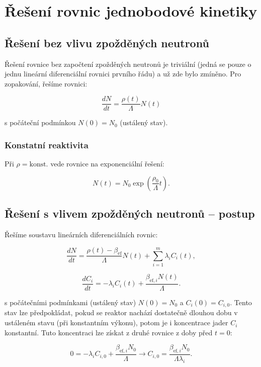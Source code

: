 \section{Řešení rovnic jednobodové kinetiky}

\subsection{Řešení bez vlivu zpožděných neutronů}

Řešení rovnice bez započtení zpožděných neutronů je triviální (jedná se pouze o jednu lineární diferenciální rovnici prvního řádu) a už zde bylo zmíněno. Pro zopakování, řešíme rovnici:

$$ \dfrac{dN}{dt} = \dfrac{\rho (t)}{\Lambda} N(t) $$

s počáteční podmínkou $N(0) = N_0$ (ustálený stav).\\

\subsubsection{Konstatní reaktivita}

Při $\rho = \text{konst.}$ vede rovnice na exponenciální řešení:

\begin{equation}
  \boxed{
  N(t) = N_0 \exp \left ( \dfrac{\rho_0}{\Lambda} t \right ).
  \label{kinetika_reseni}}
\end{equation}

\subsection{Řešení s vlivem zpožděných neutronů -- postup}

Řešíme soustavu lineárních diferenciálních rovnic:

$$ \dfrac{dN}{dt} = \dfrac{\rho(t) - \beta_{\text{ef}}}{\Lambda} N(t) + \sum_{i=1}^m \lambda_i C_i(t), $$

$$ \dfrac{dC_i}{dt} = -\lambda_i C_i(t) + \dfrac{\beta_{\text{ef},i}  N(t)}{\Lambda}. $$

s počátečními podmínkami (ustálený stav) $N(0) = N_0$ a $C_i(0) = C_{i,0}$. Tento stav lze předpokládat, pokud se reaktor nachází dostatečně dlouhou dobu v ustáleném stavu (při konstantním výkonu), potom je i koncentrace jader $C_i$ konstantní. Tuto koncentraci lze získat z druhé rovnice z doby před $t=0$:

$$ 0 = -\lambda_i C_{i,0} + \dfrac{\beta_{\text{ef},i}  N_0}{\Lambda} \rightarrow C_{i,0} = \dfrac{\beta_{\text{ef},i}  N_0}{\Lambda \lambda_i}. $$

